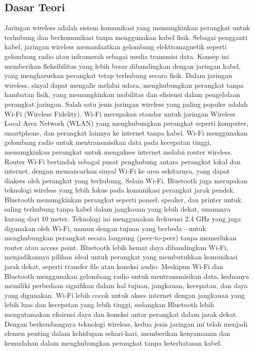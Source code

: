 \subsection{Dasar Teori}
Jaringan wireless adalah sistem komunikasi yang memungkinkan perangkat untuk terhubung dan berkomunikasi tanpa menggunakan kabel fisik. Sebagai pengganti kabel, jaringan wireless memanfaatkan gelombang elektromagnetik seperti gelombang radio atau inframerah sebagai media transmisi data. Konsep ini memberikan fleksibilitas yang lebih besar dibandingkan dengan jaringan kabel, yang mengharuskan perangkat tetap terhubung secara fisik. Dalam jaringan wireless, sinyal dapat mengalir melalui udara, menghubungkan perangkat tanpa hambatan fisik, yang memungkinkan mobilitas dan efisiensi dalam pengelolaan perangkat jaringan.
Salah satu jenis jaringan wireless yang paling populer adalah Wi-Fi (Wireless Fidelity). Wi-Fi merupakan standar untuk jaringan Wireless Local Area Network (WLAN) yang menghubungkan perangkat seperti komputer, smartphone, dan perangkat lainnya ke internet tanpa kabel. Wi-Fi menggunakan gelombang radio untuk mentransmisikan data pada kecepatan tinggi, memungkinkan perangkat untuk mengakses internet melalui router wireless. Router Wi-Fi bertindak sebagai pusat penghubung antara perangkat lokal dan internet, dengan memancarkan sinyal Wi-Fi ke area sekitarnya, yang dapat diakses oleh perangkat yang terhubung.
Selain Wi-Fi, Bluetooth juga merupakan teknologi wireless yang lebih fokus pada komunikasi perangkat jarak pendek. Bluetooth memungkinkan perangkat seperti ponsel, speaker, dan printer untuk saling terhubung tanpa kabel dalam jangkauan yang lebih dekat, umumnya kurang dari 10 meter. Teknologi ini menggunakan frekuensi 2.4 GHz yang juga digunakan oleh Wi-Fi, namun dengan tujuan yang berbeda—untuk menghubungkan perangkat secara langsung (peer-to-peer) tanpa memerlukan router atau access point. Bluetooth lebih hemat daya dibandingkan Wi-Fi, menjadikannya pilihan ideal untuk perangkat yang membutuhkan komunikasi jarak dekat, seperti transfer file atau koneksi audio.
Meskipun Wi-Fi dan Bluetooth menggunakan gelombang radio untuk mentransmisikan data, keduanya memiliki perbedaan signifikan dalam hal tujuan, jangkauan, kecepatan, dan daya yang digunakan. Wi-Fi lebih cocok untuk akses internet dengan jangkauan yang lebih luas dan kecepatan yang lebih tinggi, sedangkan Bluetooth lebih mengutamakan efisiensi daya dan koneksi antar perangkat dalam jarak dekat. Dengan berkembangnya teknologi wireless, kedua jenis jaringan ini telah menjadi elemen penting dalam kehidupan sehari-hari, memberikan kenyamanan dan kemudahan dalam menghubungkan perangkat tanpa keterbatasan kabel.
